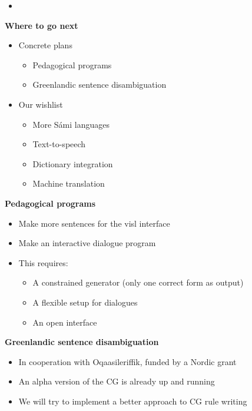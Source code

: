 \documentclass[landscape,english,11pt]{seminar}
\begin{document}
\begin{slide}
\newslide
\textbf{}
\begin{itemize}
\item
\end{itemize}


\newslide
\textbf{Where to go next}
\begin{itemize}
\item Concrete plans
\begin{itemize}
\item Pedagogical programs
\item Greenlandic sentence disambiguation
\end{itemize}
\item Our wishlist
\begin{itemize}
\item More Sámi languages
\item Text-to-speech
\item Dictionary integration
\item Machine translation
\end{itemize}
\end{itemize}


\newslide
\textbf{Pedagogical programs}
\begin{itemize}
\item Make more sentences for the visl interface
\item Make an interactive dialogue program
\item This requires:
\begin{itemize}
\item A constrained generator (only one correct form as output)
\item A flexible setup for dialogues
\item An open interface
\end{itemize}
\end{itemize}

\newslide
\textbf{Greenlandic sentence disambiguation}
\begin{itemize}
\item In cooperation with Oqaasileriffik, funded by a Nordic grant
\item An alpha version of the CG is already up and running
\item We will try to implement a better approach to CG rule writing
\end{itemize}


\end{slide}
\end{document}
